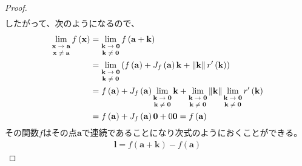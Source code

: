 \documentclass[dvipdfmx]{jsarticle}
\begin{document}
\begin{proof}
\begin{align*}
\end{align*}
したがって、次のようになるので、
\begin{align*}
\lim_{\scriptsize \begin{matrix}
\mathbf{x} \rightarrow \mathbf{a} \\
\mathbf{x} \neq \mathbf{a} \\
\end{matrix}}{f\left( \mathbf{x} \right)} &= \lim_{\scriptsize \begin{matrix}
\mathbf{k} \rightarrow \mathbf{0} \\
\mathbf{k} \neq \mathbf{0} \\
\end{matrix}}{f\left( \mathbf{a} + \mathbf{k} \right)}\\
&= \lim_{\scriptsize \begin{matrix}
\mathbf{k} \rightarrow \mathbf{0} \\
\mathbf{k} \neq \mathbf{0} \\
\end{matrix}}\left( f\left( \mathbf{a} \right) + J_{f}\left( \mathbf{a} \right)\mathbf{k} + \left\| \mathbf{k} \right\| r'\left( \mathbf{k} \right) \right)\\
&= f\left( \mathbf{a} \right) + J_{f}\left( \mathbf{a} \right)\lim_{\scriptsize \begin{matrix}
\mathbf{k} \rightarrow \mathbf{0} \\
\mathbf{k} \neq \mathbf{0} \\
\end{matrix}}\mathbf{k} + \lim_{\scriptsize \begin{matrix}
\mathbf{k} \rightarrow \mathbf{0} \\
\mathbf{k} \neq \mathbf{0} \\
\end{matrix}}\left\| \mathbf{k} \right\|\lim_{\scriptsize \begin{matrix}
\mathbf{k} \rightarrow \mathbf{0} \\
\mathbf{k} \neq \mathbf{0} \\
\end{matrix}}{r'\left( \mathbf{k} \right)}\\
&= f\left( \mathbf{a} \right) + J_{f}\left( \mathbf{a} \right)\mathbf{0} + 0\mathbf{0} = f\left( \mathbf{a} \right)
\end{align*}
その関数$f$はその点$\mathbf{a}$で連続であることになり次式のようにおくことができる。
\begin{align*}
\mathbf{l} = f\left( \mathbf{a} + \mathbf{k} \right) - f\left( \mathbf{a} \right)

\end{align*}
\end{proof}
\end{document}
